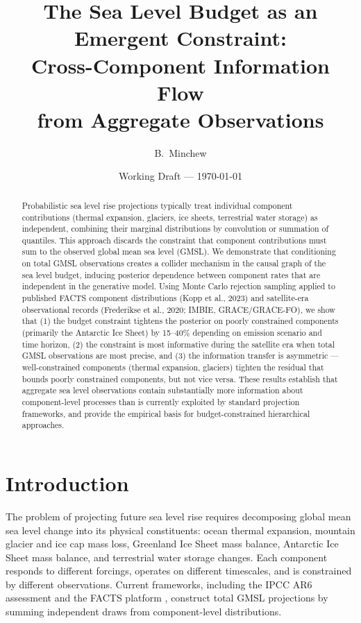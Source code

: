 \documentclass[11pt]{article}
\title{The Sea Level Budget as an Emergent Constraint:\\
  Cross-Component Information Flow\\
  from Aggregate Observations}
\author{B.\ Minchew}
\date{Working Draft --- \today}
\begin{document}
\maketitle

\begin{abstract}
Probabilistic sea level rise projections typically treat individual component contributions (thermal expansion, glaciers, ice sheets, terrestrial water storage) as independent, combining their marginal distributions by convolution or summation of quantiles.  This approach discards the constraint that component contributions must sum to the observed global mean sea level (GMSL).  We demonstrate that conditioning on total GMSL observations creates a collider mechanism in the causal graph of the sea level budget, inducing posterior dependence between component rates that are independent in the generative model.  Using Monte Carlo rejection sampling applied to published FACTS component distributions (Kopp et al., 2023) and satellite-era observational records (Frederikse et al., 2020; IMBIE, GRACE/GRACE-FO), we show that (1) the budget constraint tightens the posterior on poorly constrained components (primarily the Antarctic Ice Sheet) by 15--40\% depending on emission scenario and time horizon, (2) the constraint is most informative during the satellite era when total GMSL observations are most precise, and (3) the information transfer is asymmetric --- well-constrained components (thermal expansion, glaciers) tighten the residual that bounds poorly constrained components, but not vice versa.  These results establish that aggregate sea level observations contain substantially more information about component-level processes than is currently exploited by standard projection frameworks, and provide the empirical basis for budget-constrained hierarchical approaches.
\end{abstract}


\section{Introduction}
\label{sec:intro}

The problem of projecting future sea level rise requires decomposing global mean sea level change into its physical constituents: ocean thermal expansion, mountain glacier and ice cap mass loss, Greenland Ice Sheet mass balance, Antarctic Ice Sheet mass balance, and terrestrial water storage changes.  Each component responds to different forcings, operates on different timescales, and is constrained by different observations.  Current frameworks, including the IPCC AR6 assessment \citep{fox-kemper2021} and the FACTS platform \citep{kopp2023facts}, construct total GMSL projections by summing independent draws from component-level distributions.
\end{document}
